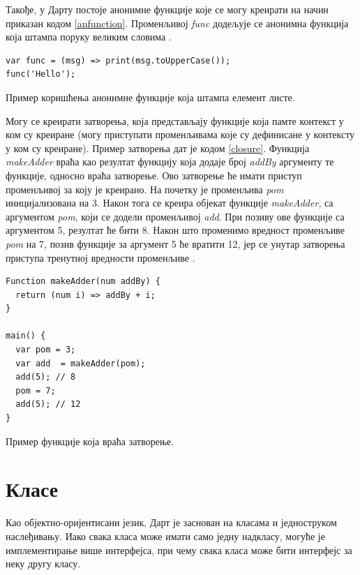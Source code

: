 \documentclass[12pt,oneside]{memoir}
\begin{document}
Такође, у Дарту постоје анонимне функције које се могу креирати на начин приказан кодом \ref{anfunction}. Променљивој \textit{func} додељује се анонимна функција која штампа поруку великим словима \cite{dart, dart1}.

\begin{listing}
\begin{verbatim}
var func = (msg) => print(msg.toUpperCase());
func('Hello');
\end{verbatim}
\caption{Пример коришћења анонимне функције која штампа елемент листе.}
\label{anfunction}
\end{listing}

Могу се креирати затворења, која представљају функције која памте контекст у ком су креиране (могу приступати променљивама које су дефинисане у контексту у ком су креиране). Пример затворења дат је кодом \ref{closure}. Функција \textit{makeAdder} враћа као резултат функцију која додаје број \textit{addBy} аргументу те функције, односно враћа затворење.  Ово затворење ће имати приступ променљивој за коју је креирано. На почетку је променљива \textit{pom} иницијализована на 3. Након тога се креира објекат функције \textit{makeAdder}, са аргументом \textit{pom}, који се додели променљивој \textit{add}. При позиву ове функције са аргументом 5, резултат ће бити 8. Након што променимо вредност променљиве \textit{pom} на 7, позив функције за аргумент 5 ће вратити 12, јер се унутар затворења приступа тренутној вредности променљиве \cite{dart, dart1}.

\begin{listing}
\begin{verbatim}
Function makeAdder(num addBy) {
  return (num i) => addBy + i;
}

main() {
  var pom = 3;
  var add  = makeAdder(pom);
  add(5); // 8
  pom = 7;
  add(5); // 12
}
\end{verbatim}
\caption{Пример функције која враћа затворење.}
\label{closure}
\end{listing}

\section{Класе}
\label{klase}
Као објектно-оријентисани језик, Дарт је заснован на класама и једноструком наслеђивању. Иако свака класа може имати само једну надкласу, могуће је имплементирање више интерфејса, при чему свака класа може бити интерфејс за неку другу класу. 
\end{document}

